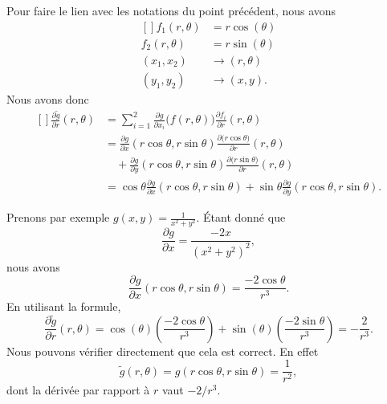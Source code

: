 Pour faire le lien avec les notations du point précédent, nous avons
\begin{equation}
    \begin{aligned}[]
        f_1(r,\theta)&=r\cos(\theta)\\
        f_2(r,\theta)&=r\sin(\theta)\\
        (x_1,x_2)&\to(r,\theta)\\
        (y_1,y_2)&\to(x,y).
    \end{aligned}
\end{equation}
Nous avons donc
\begin{equation}
    \begin{aligned}[]
        \frac{ \partial \tilde g }{ \partial r }(r,\theta)&=\sum_{i=1}^2\frac{ \partial g }{ \partial x_i }\big( f(r,\theta) \big)\frac{ \partial f_i }{ \partial r }(r,\theta)\\
        &=\frac{ \partial g }{ \partial x }(r\cos\theta,r\sin\theta)\frac{ \partial \big( r\cos\theta \big) }{ \partial r }(r,\theta)\\
        &\quad+\frac{ \partial g }{ \partial y }(r\cos\theta,r\sin\theta)\frac{ \partial \big( r\sin\theta\big) }{ \partial r }(r,\theta)\\
        &=\cos\theta\frac{ \partial g }{ \partial x }(r\cos\theta,r\sin\theta)+\sin\theta\frac{ \partial g }{ \partial y }(r\cos\theta,r\sin\theta).
    \end{aligned}
\end{equation}

Prenons par exemple $g(x,y)=\frac{1}{ x^2+y^2 }$. Étant donné que
\begin{equation}
    \frac{ \partial g }{ \partial x }=\frac{ -2x }{ (x^2+y^2)^2 },
\end{equation}
nous avons
\begin{equation}
    \frac{ \partial g }{ \partial x }(r\cos\theta,r\sin\theta)=\frac{ -2\cos\theta }{ r^3 }.
\end{equation}
En utilisant la formule,
\begin{equation}
    \frac{ \partial \tilde g }{ \partial r }(r,\theta)=\cos(\theta)\left( \frac{ -2\cos\theta }{ r^3 } \right)+\sin(\theta)\left( \frac{ -2\sin\theta }{ r^3 } \right)=-\frac{ 2 }{ r^3 }.
\end{equation}
Nous pouvons vérifier directement que cela est correct. En effet
\begin{equation}
    \tilde g(r,\theta)=g(r\cos\theta,r\sin\theta)=\frac{1}{ r^2 },
\end{equation}
dont la dérivée par rapport à $r$ vaut $-2/r^3$.

